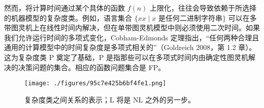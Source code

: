 然而，将计算时间通过某个具体的函数 \( f(n) \) 上限化，往往会导致依赖于所选择的机器模型的复杂度类。例如，语言集合 \(\{xx \mid x \text{ 是任何二进制字符串} \}\) 可以在多带图灵机上在线性时间内解决，但在单带图灵机模型中则必须使用二次时间。如果我们允许运行时间的多项式变化，Cobham-Edmonds 定理指出，“任何两种合理且通用的计算模型中的时间复杂度是多项式相关的”（Goldreich 2008，第 1.2 章）。这为复杂度类 P 奠定了基础，P 是指那些可以在多项式时间内由确定性图灵机解决的决策问题的集合。相应的函数问题集合是 FP。

\begin{figure}[ht]
\centering
\texttt{[image: ./figures/95c7e425b6bf4fe1.png]}
\caption{复杂度类之间关系的表示；L 将是 NL 之外的另一步。} \label{fig_JSFZ_5}
\end{figure}